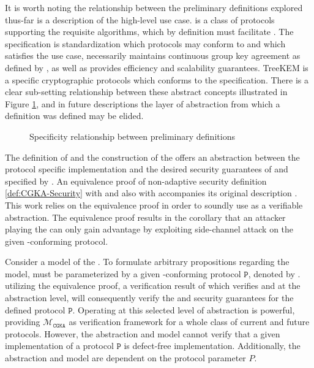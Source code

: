 It is worth noting the relationship between the preliminary definitions explored thus-far
 is a description of the high-level use case.
 is a class of protocols supporting the requisite algorithms, which by definition must facilitate .
The  specification is standardization which protocols may conform to and which satisfies the  use case, necessarily maintains continuous group key agreement as defined by , as well as provides efficiency and scalability guarantees.
TreeKEM is a specific cryptographic protocols which conforms to the  specification.
There is a clear sub-setting relationship between these abstract concepts illustrated in Figure \ref{fig:venn-protocols}, and in future descriptions the layer of abstraction from which a definition was defined may be elided.

\begin{figure}
\centering
\caption{\label{fig:venn-protocols}Specificity relationship between preliminary definitions}
\end{figure}

The definition of  and the construction of the \CGKAsec offers an abstraction between the protocol specific implementation and the desired security guarantees of  and  specified by .
An equivalence proof of non-adaptive  security definition \ref{def:CGKA-Security} with  and also with  accompanies its original description \autocite{alwen2020security}.
This work relies on the equivalence proof in order to soundly use  as a verifiable abstraction.
The equivalence proof results in the corollary that an attacker playing the \CGKAsec can only gain advantage by exploiting side-channel attack on the given -conforming protocol.

Consider a model \CGKAmod{}{}{} of the \CGKAsec.
To formulate arbitrary propositions regarding the model, \CGKAmod{}{}{} must be parameterized by a given -conforming protocol \(\mathtt{P}\), denoted by .
utilizing the equivalence proof, a verification result of  which verifies  and  at the abstraction level, will consequently verify the  and  security guarantees for the defined protocol \(\mathtt{P}\).
Operating at this selected level of abstraction is powerful, providing \(\mathcal{M}_{\texttt{CGKA}}\) as verification framework for a whole class of current and future protocols.
However, the  abstraction and model  cannot verify that a given implementation of a protocol \(\mathtt{P}\) is defect-free implementation.
Additionally, the  abstraction and model  are dependent on the protocol parameter \(P\).

